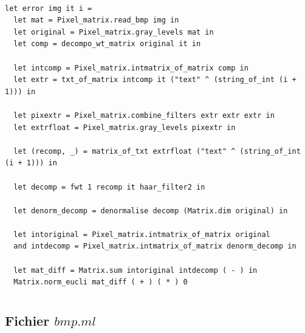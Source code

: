 \documentclass[a4paper,10pt]{report}
\theoremstyle{break}
\begin{document}
    \begin{lstlisting}

let error img it i =
  let mat = Pixel_matrix.read_bmp img in
  let original = Pixel_matrix.gray_levels mat in
  let comp = decompo_wt_matrix original it in

  let intcomp = Pixel_matrix.intmatrix_of_matrix comp in
  let extr = txt_of_matrix intcomp it ("text" ^ (string_of_int (i + 1))) in
  
  let pixextr = Pixel_matrix.combine_filters extr extr extr in
  let extrfloat = Pixel_matrix.gray_levels pixextr in

  let (recomp, _) = matrix_of_txt extrfloat ("text" ^ (string_of_int (i + 1))) in

  let decomp = fwt 1 recomp it haar_filter2 in

  let denorm_decomp = denormalise decomp (Matrix.dim original) in

  let intoriginal = Pixel_matrix.intmatrix_of_matrix original
  and intdecomp = Pixel_matrix.intmatrix_of_matrix denorm_decomp in

  let mat_diff = Matrix.sum intoriginal intdecomp ( - ) in
  Matrix.norm_eucli mat_diff ( + ) ( * ) 0
    \end{lstlisting}

\chapter{}

  \section*{Fichier $bmp.ml$}
  
\end{document}
